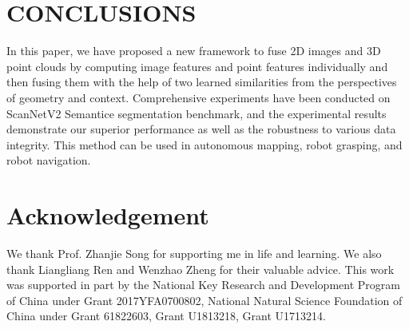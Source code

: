 \documentclass[letterpaper, 10 pt, conference]{ieeeconf}
\begin{document}
\section{CONCLUSIONS}

In this paper, we have proposed a new framework to fuse 2D images and 3D point clouds by computing image features and point features individually and then fusing them with the help of two learned similarities from the perspectives of geometry and context. Comprehensive experiments have been conducted on ScanNetV2 Semantice segmentation benchmark, and the experimental results demonstrate our superior performance as well as the robustness to various data integrity. This method can be used in autonomous mapping, robot grasping, and robot navigation. 

\section{Acknowledgement}

We thank Prof. Zhanjie Song for supporting me in life and learning. We also thank Liangliang Ren and Wenzhao Zheng for their valuable advice.
This work was supported in part by the National Key Research and Development Program of China under Grant 2017YFA0700802, National Natural Science Foundation of China under Grant 61822603, Grant U1813218, Grant U1713214.





















  \addtolength{\textheight}{-12cm}   
\end{document}
